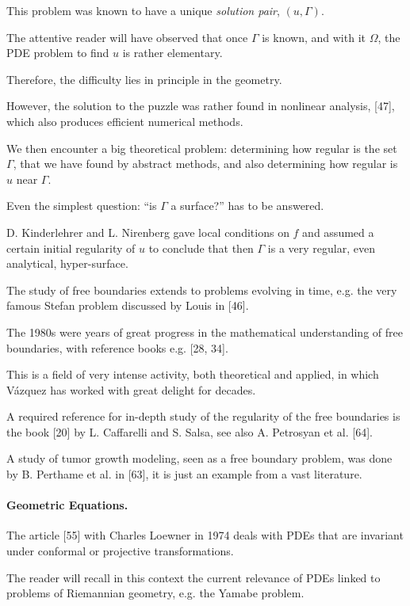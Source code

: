 \documentclass{article}
\begin{document}
%
This problem was known to have a unique \textit{solution pair}, $(u,\Gamma)$.

The attentive reader will have observed that once $\Gamma$ is known, and with it $\Omega$, the PDE problem to find $u$ is rather elementary.

Therefore, the difficulty lies in principle in the geometry.

However, the solution to the puzzle was rather found in nonlinear analysis, [47], which also produces efficient numerical methods.

%
We then encounter a big theoretical problem: determining how regular is the set $\Gamma$, that we have found by abstract methods, and also determining how regular is $u$ near $\Gamma$.

Even the simplest question: ``is $\Gamma$ a surface?'' has to be answered.

D. Kinderlehrer and L. Nirenberg gave local conditions on $f$ and assumed a certain initial regularity of $u$ to conclude that then $\Gamma$ is a very regular, even analytical, hyper-surface.

The study of free boundaries extends to problems evolving in time, e.g. the very famous Stefan problem discussed by Louis in [46].

The 1980s were years of great progress in the mathematical understanding of free boundaries, with reference books e.g. [28, 34].

%
This is a field of very intense activity, both theoretical and applied, in which V\'azquez has worked with great delight for decades.

A required reference for in-depth study of the regularity of the free boundaries is the book [20] by L. Caffarelli and S. Salsa, see also A. Petrosyan et al. [64].

A study of tumor growth modeling, seen as a free boundary problem, was done by B. Perthame et al. in [63], it is just an example from a vast literature.

\paragraph{Geometric Equations.} The article [55] with Charles Loewner in 1974 deals with PDEs that are invariant under conformal or projective transformations.

The reader will recall in this context the current relevance of PDEs linked to problems of Riemannian geometry, e.g. the Yamabe problem.
\end{document}
